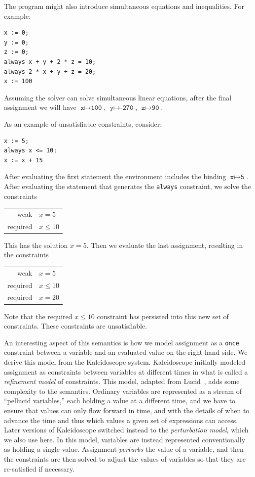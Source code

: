 The program might also introduce simultaneous equations and
inequalities.  For example:

\begin{lstlisting}
x := 0;
y := 0;
z := 0;
always x + y + 2 * z = 10;
always 2 * x + y + z = 20;
x := 100
\end{lstlisting}

Assuming the solver can solve simultaneous linear equations,
after the final assignment we will have 
$\texttt{x} \mapsto \texttt{100}$,
$\texttt{y} \mapsto \texttt{-270}$,
$\texttt{z} \mapsto \texttt{90}$.

As an example of unsatisfiable constraints, consider:

\begin{lstlisting}
x := 5;
always x <= 10;
x := x + 15
\end{lstlisting}

After evaluating the first statement the environment includes the
binding $\texttt{x} \mapsto \texttt{5}$.  After evaluating the
statement that generates the \texttt{always} constraint, we solve the
constraints
\begin{center}
\begin{tabular}{rl}
weak     & $x=5$ \\
required & $x \leq 10$
\end{tabular}
\end{center}
This has the solution $x=5$.  Then we evaluate the last assignment,
resulting in the constraints
\begin{center}
\begin{tabular}{rl}
weak     & $x=5$ \\
required & $x \leq 10$ \\
required & $x = 20$
\end{tabular}
\end{center}
Note that the required $x \leq 10$ constraint has persisted into this
new set of constraints.  These constraints are unsatisfiable.

An interesting aspect of this semantics is how we model assignment as
a \verb!once! constraint between a variable and an evaluated value on
the right-hand side. We derive this model from the Kaleidoscope
system.  Kaleidoscope initially modeled assignment as constraints
between variables at different times in what is called a
\emph{refinement model} of constraints. This model, adapted from Lucid~\cite{ashcroft-cacm-1977}, adds some complexity to the semantics.
Ordinary variables are represented as a stream of ``pellucid
variables,'' each holding a value at a different time, and we have to
ensure that values can only flow forward in time, and with the details
of when to advance the time and thus which values a given set of
expressions can access. Later versions of Kaleidoscope switched
instead to the \emph{perturbation model}, which we also use here. In
this model, variables are instead represented conventionally as
holding a single value.  Assignment \emph{perturbs} the value of a
variable, and then the constraints are then solved to adjust the
values of variables so that they are re-satisfied if necessary.

